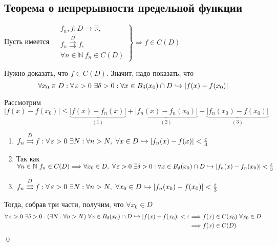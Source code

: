 \documentclass[a4paper, 10pt]{article}
\begin{document}
\subsection{Теорема о непрерывности предельной функции}
\theorem Пусть имеется $\left.\begin{aligned}
    &f_n,f: D\longrightarrow\mathbb{R},\\
    &f_n\overset{D}{\rightrightarrows} f,\\
    &\forall n\in\mathbb{N}\ f_n\in C(D)
\end{aligned}\right\}\Longrightarrow f\in C(D)$


\proof Нужно доказать, что $f\in C(D)$. Значит, надо показать, что 
\begin{equation*}
    \forall x_0\in D: \forall\operatorname{\varepsilon}>0\ \exists\delta>0:\forall x\in B_{\delta}(x_0)\cap D\hookrightarrow|f(x)-f(x_0)|
\end{equation*}

Рассмотрим $|f(x)-f(x_0)|\leqslant\underbrace{|f(x)-f_n(x)|}_{(1)}+\underbrace{|f_n(x)-f_n(x_0)|}_{(2)}+\underbrace{|f_n(x_0)-f(x_0)|}_{(3)}$
\begin{enumerate}
    \item $f_n\overset{D}{\rightrightarrows} f:\forall\operatorname{\varepsilon}>0\ \exists N:\forall n>N,\ \forall x\in D\hookrightarrow|f_n(x)-f(x)|<\frac{\operatorname{\varepsilon}}{3}$
    \item Так как $\forall n\in\mathbb{N}\ f_n\in C(D)\Longrightarrow\forall x_0\in D,\ \forall\ve>0\ \exists\delta>0:\forall x\in B_{\delta}(x_0)\cap D\hookrightarrow|f_n(x)-f_n(x_0)|<\frac{\ve}{3}$
    \item $f_n\overset{D}{\rightrightarrows} f:\forall\operatorname{\varepsilon}>0\ \exists N:\forall n>N,\ \forall x_0\in D\hookrightarrow|f_n(x_0)-f(x_0)|<\frac{\operatorname{\varepsilon}}{3}$
\end{enumerate}

Тогда, собрав три части, получим, что $\forall x_0\in D$
\begin{equation*}
    \begin{aligned}
        \forall\ve>0\ \exists \delta>0:(\exists N:\forall n>N)\ \forall x\in B_{\delta}(x_0)\cap D\hookrightarrow|f(x)-f(x_0)|<\ve&\Longrightarrow f(x)\in C(x_0)\ \forall x_0\in D\\
        &\Longrightarrow f(x)\in C(D)
    \end{aligned}
\end{equation*}\qed
\end{document}
